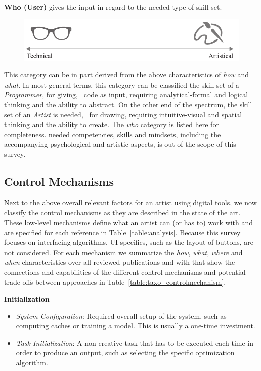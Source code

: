 \noindent\textbf{Who (User)} gives the input in regard to the needed type of skill set. 
\begin{figure}[H]
    \centering
        \includegraphics[width=\controlParamsFigWidth\linewidth]{figures/control_paradigms/who.pdf}
\end{figure}

This category can be in part derived from the above characteristics of \textit{how} and \textit{what}. In most general terms, this category can be classified the skill set of a \textit{Programmer}, for giving, \eg~code as input, requiring analytical-formal and logical thinking and the ability to abstract. On the other end of the spectrum, the skill set of an \textit{Artist} is needed, \eg~for drawing, requiring intuitive-visual and spatial thinking and the ability to create. The \textit{who} category is listed here for completeness.  needed competencies, skill\revremove{}{-}s and mindsets, including the accompanying psychological and artistic aspects, is out of the scope of this survey.

\subsection{Control Mechanisms}\label{subsec:taxo_control_mechanism}
Next to the above overall relevant factors for an artist using digital tools, we now classify the control mechanisms as they are described in the state of the art. These low-level mechanisms define what an artist can (or has to) work with and are specified for each reference in Table~\ref{table:analysis}. Because this survey focuses on interfacing algorithms, UI specifics, such as the layout of buttons, are not considered. For each mechanism we summarize the \textit{how}, \textit{what}, \textit{where} and \textit{when} characteristics over all reviewed publications and with that show the connections and capabilities of the different control mechanisms and potential trade-offs between approaches in Table~\ref{table:taxo_controlmechanism}.

\noindent\textbf{Initialization}
\begin{itemize}
    \item \textit{System Configuration}: Required overall setup of the system, such as computing caches or training a model. This is usually a one-time investment.
    \item \textit{Task Initialization}: A non-creative task that has to be executed each time in order to produce an output, such as selecting the specific optimization algorithm.
\end{itemize}

